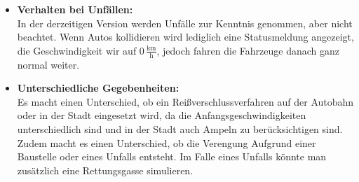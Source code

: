 \begin{itemize}
\item \textbf{Verhalten bei Unfällen:}\\
In der derzeitigen Version werden Unfälle zur Kenntnis genommen, aber nicht beachtet. Wenn Autos kollidieren wird lediglich eine Statusmeldung angezeigt, die Geschwindigkeit wir auf 0\,$ \frac{\text{km}}{\text{h}} $, jedoch fahren die Fahrzeuge danach ganz normal weiter.

\item \textbf{Unterschiedliche Gegebenheiten:}\\
Es macht einen Unterschied, ob ein Reißverschlussverfahren auf der Autobahn oder in der Stadt eingesetzt wird, da die Anfangsgeschwindigkeiten unterschiedlich sind und in der Stadt auch Ampeln zu berücksichtigen sind.\\
Zudem macht es einen Unterschied, ob die Verengung Aufgrund einer Baustelle oder eines Unfalls entsteht. Im Falle eines Unfalls könnte man zusätzlich eine Rettungsgasse simulieren.
\end{itemize}